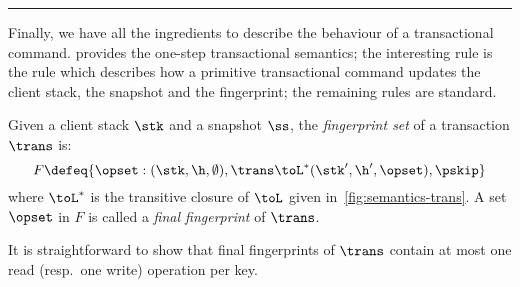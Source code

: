 %
\begin{figure*}[!t]
{}
\hrule\vspace{5pt}
\caption{Transactional semantics rules}
\label{fig:semantics-trans}
\end{figure*}

Finally, we have all the ingredients to describe the behaviour of a transactional command.   provides the one-step transactional semantics; 
the interesting rule is the  rule which describes how a primitive transactional command updates the client stack, the snapshot and the fingerprint; 
the remaining rules are standard.



\begin{definition}
Given a client stack $\stk$ and a snapshot $\ss$, the \emph{fingerprint set} of a transaction $\trans$ is:
\[F \defeq
\{\opset : (\stk, \h, \emptyset), \trans \toL^* (\stk', \h', \opset),
\pskip \}
\]
where $\toL^*$ is the transitive closure of $\toL$ given in~\cref{fig:semantics-trans}.  
A set $\opset$ in $F$ is called a \emph{final fingerprint} of $\trans$. 
\end{definition}
\noindent It is straightforward to show that final fingerprints of $\trans$ contain at most one read (resp.\ one write) operation per key. \\

